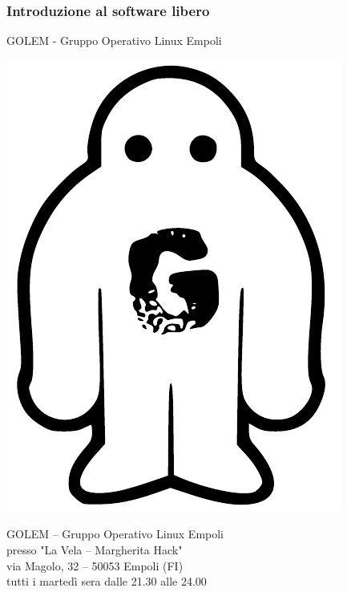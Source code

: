 \documentclass{beamer}
\begin{document}
\begin{frame}
  \frametitle{Introduzione al software libero}

    \begin{block}{GOLEM - Gruppo Operativo Linux Empoli}
        \begin{minipage}{.15\linewidth}
            \includegraphics[width=1\linewidth]{img/GOLEM-logo.pdf}
        \end{minipage}
        \begin{minipage}{.65\linewidth}
            \centering
            GOLEM -- Gruppo Operativo Linux Empoli\\
            presso "La Vela -- Margherita Hack"\\
            via Magolo, 32 -- 50053 Empoli (FI)\\
            tutti i martedì sera dalle 21.30 alle 24.00
        \end{minipage}
        \begin{minipage}{.15\linewidth}

\end{minipage}
\end{block}
\end{frame}
\end{document}
